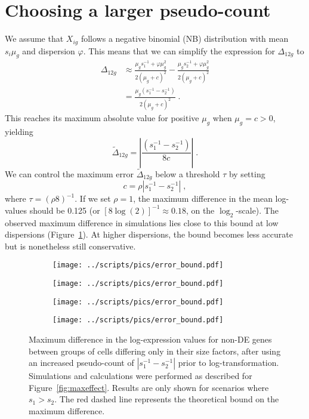 \documentclass[10pt,letterpaper]{article}
\begin{document}
\section{Choosing a larger pseudo-count}
We assume that $X_{ig}$ follows a negative binomial (NB) distribution with mean $s_i\mu_g$ and dispersion $\varphi$.
This means that we can simplify the expression for $\Delta_{12g}$ to
\begin{align}
\Delta_{12g} 
&\approx \frac{\mu_g s_1^{-1} + \varphi \mu_g^2}{2(\mu_g + c)^2} - \frac{\mu_g s_2^{-1} + \varphi \mu_g^2}{2(\mu_g + c)^2} \nonumber \\
&= \frac{\mu_g (s_1^{-1} - s_2^{-1})}{2(\mu_g + c)^2} \;. \label{eqn:nberr}
\end{align}
This reaches its maximum absolute value for positive $\mu_g$ when $\mu_g = c > 0$, yielding 
\[
\tilde\Delta_{12g} = \left|\frac{(s_1^{-1} - s_2^{-1})}{8c}\right| \;.
\]
We can control the maximum error $\tilde\Delta_{12g}$ below a threshold $\tau$ by setting  
\[
    c = \rho |s_1^{-1} - s_2^{-1}| \;,
\]
where $\tau = (\rho 8)^{-1}$.
If we set $\rho = 1$, the maximum difference in the mean log-values should be 0.125 (or $[8\log(2)]^{-1} \approx 0.18$, on the $\log_2$-scale).
The observed maximum difference in simulations lies close to this bound at low dispersions (Figure~\ref{fig:cappederr}).
At higher dispersions, the bound becomes less accurate but is nonetheless still conservative.

\begin{figure}[btp]
\centering
\begin{subfigure}[b]{0.49\textwidth}
    \texttt{[image: ../scripts/pics/error\_bound.pdf]}
    \caption{}
\end{subfigure}
\begin{subfigure}[b]{0.49\textwidth}
    \texttt{[image: ../scripts/pics/error\_bound.pdf]}
    \caption{}
\end{subfigure}
\begin{subfigure}[b]{0.49\textwidth}
    \texttt{[image: ../scripts/pics/error\_bound.pdf]}
    \caption{}
\end{subfigure}
\begin{subfigure}[b]{0.49\textwidth}
    \texttt{[image: ../scripts/pics/error\_bound.pdf]}
    \caption{}
\end{subfigure}
\caption{Maximum difference in the log-expression values for non-DE genes between groups of cells differing only in their size factors, 
after using an increased pseudo-count of $|s_1^{-1} - s_2^{-1}|$ prior to log-transformation.
Simulations and calculations were performed as described for Figure~\ref{fig:maxeffect}.
Results are only shown for scenarios where $s_1 > s_2$.
The red dashed line represents the theoretical bound on the maximum difference.
}
\label{fig:cappederr}
\end{figure}
\end{document}
